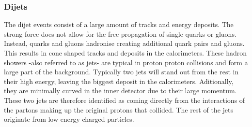 \documentclass[twoside,        %
               BCOR12mm,       %
               ngerman,english, %
               fleqn,headsepline=false,footsepline=false
              ]{Vorlage/MFPREPORT}
\begin{document}
\subsubsection{Dijets}
The dijet events consist of a large amount of tracks and energy deposits.
The strong force does not allow for the free propagation of single quarks or
gluons. Instead, quarks and gluons hadronise creating additional quark pairs
and gluons. This results in cone shaped tracks and deposits in the
calorimeters. These hadron showers -also referred to as jets- are typical in
proton proton collisions and form a large part of the background. Typically two
jets will stand out from the rest in their high energy, leaving the biggest
deposit in the calorimeters. Aditionally, they are minimally
curved in the inner detector due to their large momentum. These two jets are
therefore identified as coming directly from the interactions of the partons
making up the original protons that collided. The rest of the jets originate
from low energy charged particles.
\end{document}
